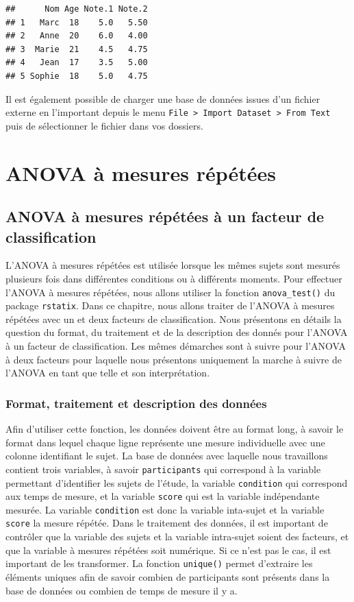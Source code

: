 \documentclass[
]{book}
\begin{document}
\begin{verbatim}
##      Nom Age Note.1 Note.2
## 1   Marc  18    5.0   5.50
## 2   Anne  20    6.0   4.00
## 3  Marie  21    4.5   4.75
## 4   Jean  17    3.5   5.00
## 5 Sophie  18    5.0   4.75
\end{verbatim}

Il est également possible de charger une base de données issues d'un fichier externe en l'important depuis le menu \texttt{File\ \textgreater{}\ Import\ Dataset\ \textgreater{}\ From\ Text} puis de sélectionner le fichier dans vos dossiers.

\chapter{ANOVA à mesures répétées}\label{anova-uxe0-mesures-ruxe9puxe9tuxe9es}

\section{ANOVA à mesures répétées à un facteur de classification}\label{anova-uxe0-mesures-ruxe9puxe9tuxe9es-uxe0-un-facteur-de-classification}

L'ANOVA à mesures répétées est utilisée lorsque les mêmes sujets sont mesurés plusieurs fois dans différentes conditions ou à différents moments. Pour effectuer l'ANOVA à mesures répétées, nous allons utiliser la fonction \texttt{anova\_test()} du package \texttt{rstatix}. Dans ce chapitre, nous allons traiter de l'ANOVA à mesures répétées avec un et deux facteurs de classification. Nous présentons en détails la question du format, du traitement et de la description des donnés pour l'ANOVA à un facteur de classification. Les mêmes démarches sont à suivre pour l'ANOVA à deux facteurs pour laquelle nous présentons uniquement la marche à suivre de l'ANOVA en tant que telle et son interprétation.

\subsection{Format, traitement et description des données}\label{format-traitement-et-description-des-donnuxe9es}

Afin d'utiliser cette fonction, les données doivent être au format long, à savoir le format dans lequel chaque ligne représente une mesure individuelle avec une colonne identifiant le sujet. La base de données avec laquelle nous travaillons contient trois variables, à savoir \texttt{participants} qui correspond à la variable permettant d'identifier les sujets de l'étude, la variable \texttt{condition} qui correspond aux temps de mesure, et la variable \texttt{score} qui est la variable indépendante mesurée. La variable \texttt{condition} est donc la variable inta-sujet et la variable \texttt{score} la mesure répétée. Dans le traitement des données, il est important de contrôler que la variable des sujets et la variable intra-sujet soient des facteurs, et que la variable à mesures répétées soit numérique. Si ce n'est pas le cas, il est important de les transformer. La fonction \texttt{unique()} permet d'extraire les éléments uniques afin de savoir combien de participants sont présents dans la base de données ou combien de temps de mesure il y a.
\end{document}

